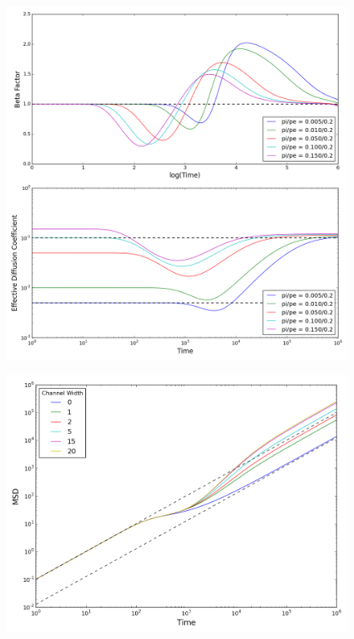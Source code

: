 	\begin{figure}[h]
		\centering
		\includegraphics[width=1.0\linewidth]{../images/2D/pipe_beta_deff_2D}
		\caption{}
		\label{fig:pipe_beta_deff_2D}
	\end{figure}
	
	\begin{figure}[h]
		\centering
		\includegraphics[width=1.0\linewidth]{../images/2D/ye_msd_2D}
		\caption{}
		\label{fig:ye_msd_2D}
	\end{figure}
	
